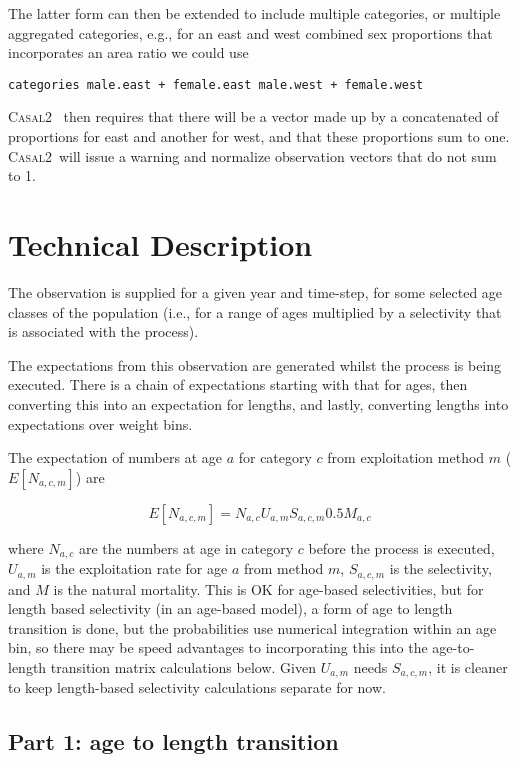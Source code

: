 \documentclass[a4paper,11pt,twoside,pdftex,draft]{article}
\newcommand{\CNAME}{\textsc{Casal2}}
\begin{document}
The latter form can then be extended to include multiple categories, or multiple aggregated categories, e.g., for an east and west combined sex proportions that incorporates an area ratio we could use

\texttt{categories male.east + female.east   male.west + female.west}

\CNAME~ then requires that there will be a vector made up by a concatenated of proportions for east and another for west, and that these proportions sum to one. \CNAME~will issue a warning and normalize observation vectors that do not sum to 1.

\section{Technical Description}


The observation is supplied for a given year and time-step, for some selected age classes of the population (i.e., for a range of ages multiplied by a selectivity that is associated with the process).


The expectations from this observation are generated whilst the process is being executed. There is a chain of expectations starting with that for ages, then converting this into an expectation for lengths, and lastly, converting lengths into expectations over weight bins.

The expectation of numbers at age $a$ for category $c$ from exploitation method $m$ ($E[N_{a,c,m}]$) are

\begin{equation}
E[N_{a,c,m}] = N_{a,c} U_{a,m} S_{a,c,m} 0.5 M_{a,c}
\end{equation}

where $N_{a,c}$ are the numbers at age in category $c$ before the process is executed, $U_{a,m}$ is the exploitation rate for age $a$ from method $m$, $S_{a,c,m}$ is the selectivity, and $M$ is the natural mortality. This is OK for age-based selectivities, but for length based selectivity (in an age-based model), a form of age to length transition is done, but the probabilities use numerical integration within an age bin, so there may be speed advantages to incorporating this into the age-to-length transition matrix calculations below. Given $U_{a,m}$ needs $S_{a,c,m} $, it is cleaner to keep length-based selectivity calculations separate for now.


\subsection{Part 1: age to length transition}
\end{document}
